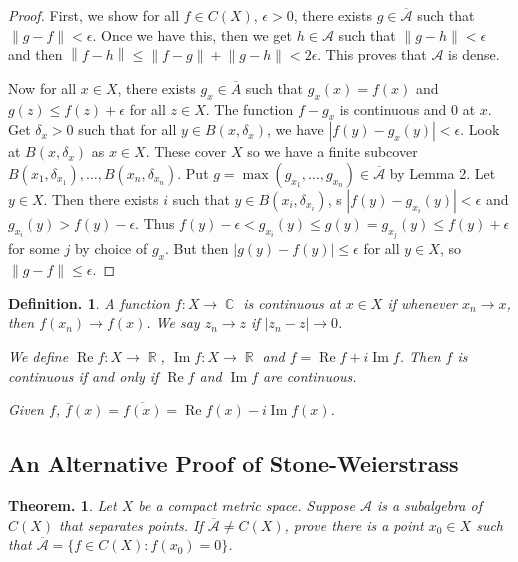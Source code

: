 \documentclass[11pt, a4paper]{memoir}
\DeclareMathOperator{\R}{{\mathbb{R}}}
\DeclareMathOperator{\C}{{\mathbb{C}}}
\newcommand{\norm}[1]{\ensuremath{\left\lVert#1\right\rVert}}
\theoremstyle{change}
\newtheorem{theorem}{Theorem.}[section]
\theoremstyle{plain}
\theoremstyle{nonumberplain}
\newtheorem{definition}{Definition.}
\newtheorem{proof}{Proof}
\renewcommand{\Re}{\ensuremath{\operatorname{Re}}}
\renewcommand{\Im}{\ensuremath{\operatorname{Im}}}
\renewcommand{\Re}{\ensuremath{\operatorname{Re}}}
\renewcommand{\Im}{\ensuremath{\operatorname{Im}}}
\numberwithin{equation}{section}
\begin{document}
\begin{proof}
    First, we show for all $f\in C(X)$, $\epsilon>0$, there exists $g\in\overline{\mathcal{A}}$ such that $\norm{g-f}<\epsilon$.
    Once we have this, then we get $h\in\mathcal{A}$ such that $\norm{g-h}<\epsilon$ and then $\norm{f-h}\leq\norm{f-g}+\norm{g-h}<2\epsilon$.
    This proves that $\mathcal{A}$ is dense.

    Now for all $x\in X$, there exists $g_x\in\overline{A}$ such that $g_x(x)=f(x)$ and $g(z)\leq f(z)+\epsilon$ for all $z\in X$.
    The function $f-g_x$ is continuous and $0$ at $x$.
    Get $\delta_x>0$ such that for all $y\in B(x,\delta_x)$, we have $|f(y)-g_x(y)|<\epsilon$.
    Look at $B(x,\delta_x)$ as $x\in X$.
    These cover $X$ so we have a finite subcover $B(x_1,\delta_{x_1}),\ldots,B(x_n,\delta_{x_n})$.
    Put $g=\max(g_{x_1},\ldots,g_{x_n})\in\overline{\mathcal{A}}$ by Lemma 2.
    Let $y\in X$.
    Then there exists $i$ such that $y\in B(x_i,\delta_{x_i})$, s $|f(y)-g_{x_i}(y)|<\epsilon$ and $g_{x_i}(y)>f(y)-\epsilon$.
    Thus $f(y)-\epsilon<g_{x_i}(y)\leq g(y)=g_{x_j}(y)\leq f(y)+\epsilon$ for some $j$ by choice of $g_x$.
    But then $|g(y)-f(y)|\leq\epsilon$ for all $y\in X$, so $\norm{g-f}\leq\epsilon$.
\end{proof}
\begin{definition}
    A function $f:X\to\C$ is continuous at $x\in X$ if whenever $x_n\to x$, then $f(x_n)\to f(x)$.
    We say $z_n\to z$ if $|z_n-z|\to 0$.

    We define $\Re f:X\to\R$, $\Im f:X\to\R$ and $f=\Re f+i\Im f$.
    Then $f$ is continuous if and only if $\Re f$ and $\Im f$ are continuous.

    Given $f$, $\overline{f}(x)=\overline{f(x)}=\Re f(x)-i\Im f(x)$.
\end{definition}
\subsection{An Alternative Proof of Stone-Weierstrass}
\begin{theorem}
    Let $X$ be a compact metric space.
    Suppose $\mathcal{A}$ is a subalgebra of $C(X)$ that separates points.
    If $\overline{\mathcal{A}}\neq C(X)$, prove there is a point $x_0\in X$ such that $\overline{\mathcal{A}}=\{f\in C(X):f(x_0)=0\}$.
\end{theorem}
\end{document}
